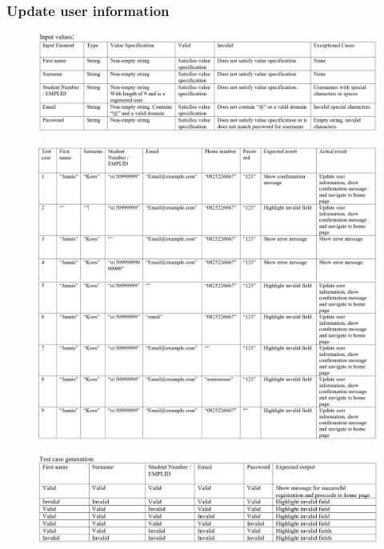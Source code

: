 \documentclass[english]{article}
\begin{document}
\subsubsection{Update user information}
\begin{figure}[H]
\hspace*{-2.5cm}
\includegraphics[width=180mm]{9.png}
\end{figure}
\begin{figure}[H]
\hspace*{-2.5cm}
\includegraphics[width=180mm]{10.png}
\end{figure}
\begin{figure}[H]
\hspace*{-2.5cm}
\includegraphics[width=180mm]{11.png}
\end{figure}
\end{document}

